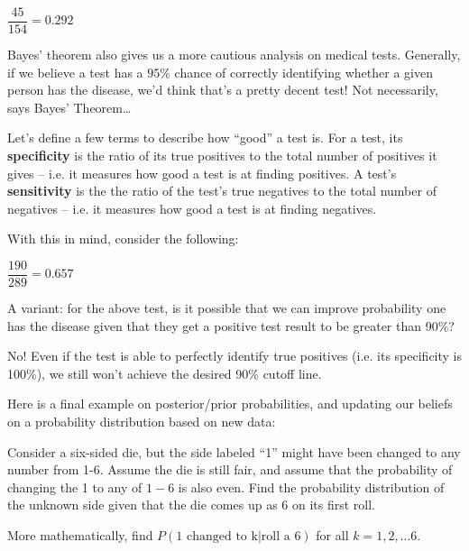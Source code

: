 \documentclass[../main.tex]{subfiles}
\begin{document}
\begin{example}[Hospital, 10.4]
\end{example}
\begin{solution}[Answer.]
$\dfrac{45}{154} = 0.292$
\end{solution}

Bayes' theorem also gives us a more cautious analysis on medical tests. Generally, if we believe a test has a $95\%$ chance of correctly identifying whether a given person has the disease, we'd think that's a pretty decent test! Not necessarily, says Bayes' Theorem\ldots

Let's define a few terms to describe how ``good'' a test is. For a test, its \textbf{specificity} is the ratio of its true positives to the total number of positives it gives -- i.e. it measures how good a test is at finding positives. A test's \textbf{sensitivity} is the the ratio of the test's true negatives to the total number of negatives -- i.e. it measures how good a test is at finding negatives.

With this in mind, consider the following: 
\begin{example}[Disease, 10.7]

\end{example}
\begin{solution}[Answer.]
$\dfrac{190}{289} = 0.657$
\end{solution}

\begin{example}
A variant: for the above test, is it possible that we can improve probability one has the disease given that they get a positive test result to be greater than 90\%? 
\end{example}

\begin{solution}[Answer]
No! Even if the test is able to perfectly identify true positives (i.e. its specificity is 100\%), we still won't achieve the desired 90\% cutoff line. 
\end{solution}

Here is a final example on posterior/prior probabilities, and updating our beliefs on a probability distribution based on new data: 
\begin{example} %
Consider a six-sided die, but the side labeled ``1'' might have been changed to any number from 1-6. Assume the die is still fair, and assume that the probability of changing the 1 to any of $1-6$ is also even. Find the probability distribution of the unknown side given that the die comes up as 6 on its first roll. 

More mathematically, find $P(\text{1 changed to k}|\text{roll a 6})$ for all $k = 1, 2, \ldots 6$. 
\end{example}
\end{document}
